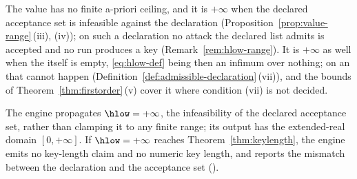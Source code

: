 
The value has no finite a-priori ceiling, and it is $+\infty$ when the
declared acceptance set is infeasible against the declaration
(Proposition~\ref{prop:value-range}\,(iii), (iv)); on such a declaration no
attack the declared list admits is accepted and no run produces a key
(Remark~\ref{rem:hlow-range}). It is $+\infty$ as well when the
 itself is empty, \eqref{eq:hlow-def} being then an infimum
over nothing; on an  that cannot happen
(Definition~\ref{def:admissible-declaration}\,(vii)), and the bounds of
Theorem~\ref{thm:firstorder}\,(v) cover it where condition (vii)
is not decided.

\begin{requirement}\label{req:infinite-value}
The engine propagates $\hlow=+\infty$, the infeasibility of the declared
acceptance set, rather than clamping it to any finite range; its output
 has the extended-real domain $[0,+\infty]$. If $\hlow=+\infty$
reaches Theorem~\ref{thm:keylength}, the engine emits no key-length claim and
no numeric key length, and reports the mismatch between the declaration and
the acceptance set ().
\end{requirement}
